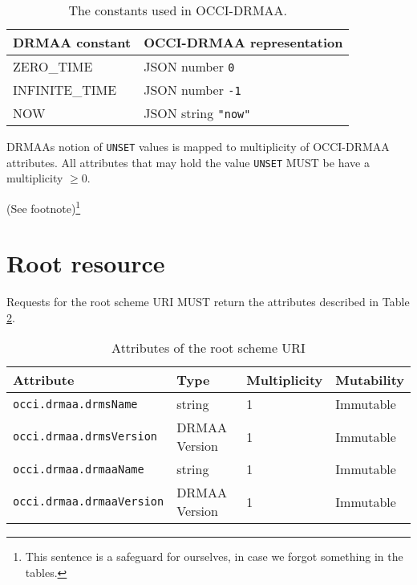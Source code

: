 \documentclass[10pt]{article}
\newcommand{\h}[1]{\lstinline|#1|}
\newcommand{\rat}[1]{ {\tiny(See footnote)}\footnote{#1} }
\begin{document}


\begin{table}[ht]
\centering
\begin{tabularx}{\textwidth}{|l|>{\raggedright\arraybackslash}X|}
\hline
DRMAA constant & OCCI-DRMAA representation\\
\hline
ZERO\_TIME     & JSON number \h{0} \\
INFINITE\_TIME & JSON number \h{-1} \\
NOW            & JSON string \h{"now"} \\
\hline
\end{tabularx}
\caption{The constants used in OCCI-DRMAA. }
\label{tab:constants}
\end{table}

DRMAAs notion of \h{UNSET} values is mapped to multiplicity of OCCI-DRMAA attributes. All attributes that may hold the value \h{UNSET} MUST be have a multiplicity $\geq 0$.

\rat{This sentence is a safeguard for ourselves, in case we forgot something in the tables.}

\section{Root resource}

Requests for the root scheme URI MUST return the attributes described in Table \ref{tab:globalattributes}.

\begin{table}[ht]
\centering
\begin{tabularx}{\textwidth}{|l|X|X|X|}
\hline
Attribute    & Type   & Multiplicity & Mutability \\
\hline
\h{occi.drmaa.drmsName}     & string       & 1            & Immutable \\ %
\h{occi.drmaa.drmsVersion}  & DRMAA Version      & 1            & Immutable \\ %
\h{occi.drmaa.drmaaName}    & string       & 1            & Immutable \\ %
\h{occi.drmaa.drmaaVersion} & DRMAA Version      & 1            & Immutable \\ %
\hline
\end{tabularx}
\caption{Attributes of the root scheme URI}
\label{tab:globalattributes}
\end{table}
\end{document}
